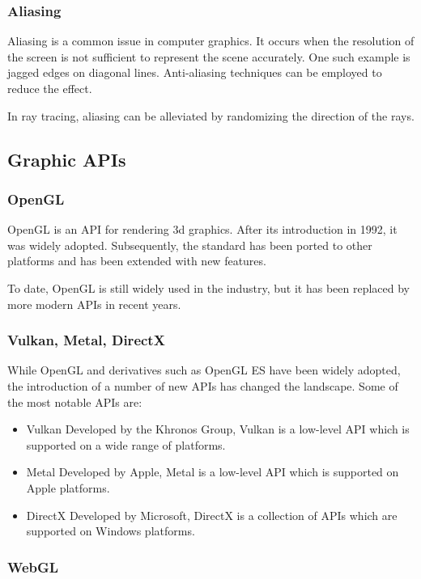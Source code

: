 \subsubsection{Aliasing}

Aliasing is a common issue in computer graphics. It occurs when the resolution of the screen is not sufficient to represent the scene accurately. One such example is jagged edges on diagonal lines. Anti-aliasing techniques can be employed to reduce the effect.

In ray tracing, aliasing can be alleviated by randomizing the direction of the rays.

\subsection{Graphic APIs}
\subsubsection{OpenGL}

OpenGL is an API for rendering 3d graphics. After its introduction in 1992, it was widely adopted. Subsequently, the standard has been ported to other platforms and has been extended with new features.

To date, OpenGL is still widely used in the industry, but it has been replaced by more modern APIs in recent years.

\subsubsection{Vulkan, Metal, DirectX}

While OpenGL and derivatives such as OpenGL ES have been widely adopted, the introduction of a number of new APIs has changed the landscape. Some of the most notable APIs are:

\begin{itemize}
    \item{Vulkan} Developed by the Khronos Group, Vulkan is a low-level API which is supported on a wide range of platforms.
    \item{Metal} Developed by Apple, Metal is a low-level API which is supported on Apple platforms.
    \item{DirectX} Developed by Microsoft, DirectX is a collection of APIs which are supported on Windows platforms.
\end{itemize}

\subsubsection{WebGL}

